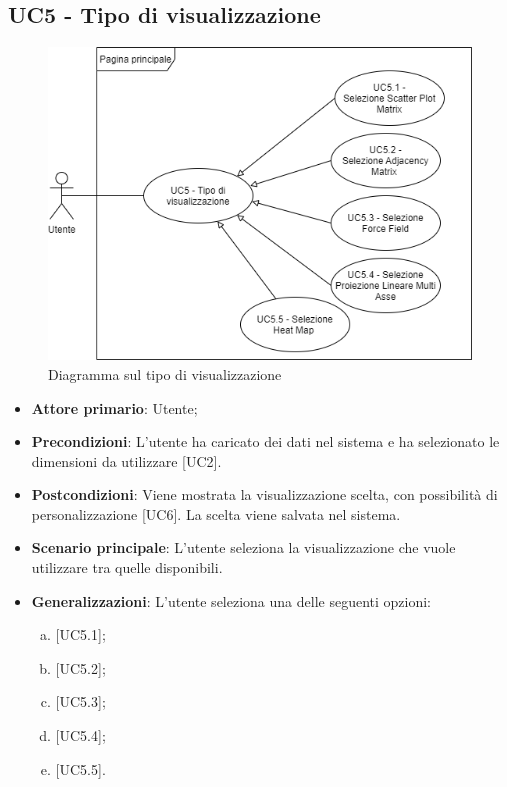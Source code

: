 \subsection{UC5 - Tipo di visualizzazione}
\begin{figure}[!htb]
\includegraphics[width=\linewidth]{Section/Images/UC5.png}
\centering
\caption{Diagramma sul tipo di visualizzazione}
\end{figure}

\begin{itemize}
	\item \textbf{Attore primario}: Utente;
	\item \textbf{Precondizioni}: L'utente ha caricato dei dati nel sistema e ha selezionato le dimensioni da utilizzare [UC2].
	\item \textbf{Postcondizioni}: Viene mostrata la visualizzazione scelta, con possibilità di personalizzazione [UC6]. La scelta viene salvata nel sistema.
	\item \textbf{Scenario principale}: L'utente seleziona la visualizzazione che vuole utilizzare tra quelle disponibili.
	\item \textbf{Generalizzazioni}: L'utente seleziona una delle seguenti opzioni:
		\begin{enumerate}[(a)]
			\item {} [UC5.1];
			\item {} [UC5.2];
			\item {} [UC5.3];
			\item {} [UC5.4];
			\item {} [UC5.5].
		\end{enumerate}

\end{itemize}